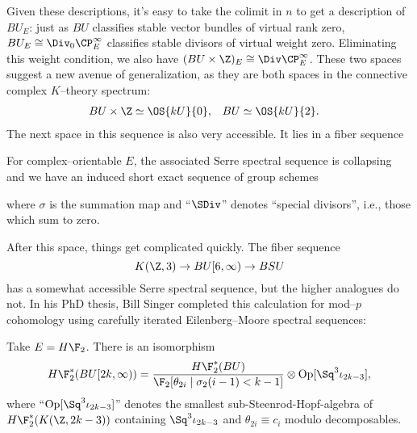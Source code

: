 Given these descriptions, it's easy to take the colimit in $n$ to get a description of $BU_E$: just as $BU$ classifies stable vector bundles of virtual rank zero, $BU_E \cong \Div_0 \CP^\infty_E$ classifies stable divisors of virtual weight zero.  Eliminating this weight condition, we also have $(BU \times \Z)_E \cong \Div \CP^\infty_E$.  These two spaces suggest a new avenue of generalization, as they are both spaces in the connective complex $K$--theory spectrum:
\begin{align*}
BU \times \Z & \simeq \OS{kU}{0}, & BU & \simeq \OS{kU}{2}.
\end{align*}
The next space in this sequence is also very accessible.  It lies in a fiber sequence
\begin{center}
\end{center}
For complex--orientable $E$, the associated Serre spectral sequence is collapsing and we have an induced short exact sequence of group schemes
\begin{center}
\end{center}
where $\sigma$ is the summation map and ``$\SDiv$'' denotes ``special divisors'', i.e., those which sum to zero.

After this space, things get complicated quickly.  The fiber sequence \[K(\Z, 3) \to BU[6, \infty) \to BSU\] has a somewhat accessible Serre spectral sequence, but the higher analogues do not.  In his PhD thesis, Bill Singer completed this calculation for mod--$p$ cohomology using carefully iterated Eilenberg--Moore spectral sequences:

\begin{theorem}
Take $E = H\F_2$.  There is an isomorphism \[H\F_2^*(BU[2k,\infty)) = \frac{H\F_2^*(BU)}{\F_2[\theta_{2i} \mid \sigma_2(i - 1) < k - 1]} \otimes \operatorname{Op}[\Sq^3 \iota_{2k-3}],\] where ``$\operatorname{Op}[\Sq^3 \iota_{2k-3}]$'' denotes the smallest sub-Steenrod-Hopf-algebra of $H\F_2^*(K(\Z, 2k-3))$ containing $\Sq^3 \iota_{2k-3}$ and $\theta_{2i} \equiv c_i$ modulo decomposables.
\end{theorem}

